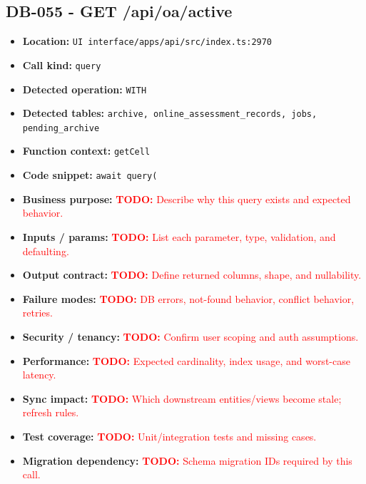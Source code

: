 \documentclass[11pt]{article}
\newcommand{\todoitem}[1]{\textcolor{red}{\textbf{TODO:} #1}}
\begin{document}
\subsection{DB-055 - GET /api/oa/active}
\begin{itemize}[leftmargin=1.5em]
\item \textbf{Location:} \texttt{UI interface/apps/api/src/index.ts:2970}
\item \textbf{Call kind:} \texttt{query}
\item \textbf{Detected operation:} \texttt{WITH}
\item \textbf{Detected tables:} \texttt{archive, online\_assessment\_records, jobs, pending\_archive}
\item \textbf{Function context:} \texttt{getCell}
\item \textbf{Code snippet:} \texttt{await query(}
\item \textbf{Business purpose:} \todoitem{Describe why this query exists and expected behavior.}
\item \textbf{Inputs / params:} \todoitem{List each parameter, type, validation, and defaulting.}
\item \textbf{Output contract:} \todoitem{Define returned columns, shape, and nullability.}
\item \textbf{Failure modes:} \todoitem{DB errors, not-found behavior, conflict behavior, retries.}
\item \textbf{Security / tenancy:} \todoitem{Confirm user scoping and auth assumptions.}
\item \textbf{Performance:} \todoitem{Expected cardinality, index usage, and worst-case latency.}
\item \textbf{Sync impact:} \todoitem{Which downstream entities/views become stale; refresh rules.}
\item \textbf{Test coverage:} \todoitem{Unit/integration tests and missing cases.}
\item \textbf{Migration dependency:} \todoitem{Schema migration IDs required by this call.}
\end{itemize}
\end{document}
